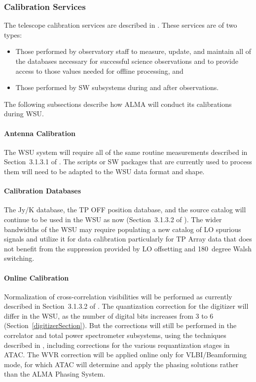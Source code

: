 

\subsubsection{Calibration Services}

The telescope calibration services are described in \cite{acsos}. These services are of two types: 
\begin{itemize}[itemsep=-0.5em]
    \item Those performed by observatory staff to measure, update, and maintain all of the  databases necessary for successful science observations and to provide access to those values needed for offline processing, and
    \item Those performed by SW subsystems during and after
observations. 
\end{itemize}

The following subsections describe how ALMA will conduct its calibrations during WSU. 


\paragraph{Antenna Calibration}  
The WSU system will require all of the same routine measurements
described in Section~3.1.3.1 of \cite{CSA-IA}.  The scripts or
SW packages that are currently used to process them will
need to be adapted to the WSU data format and shape.

\paragraph{Calibration Databases}
The Jy/K database, the TP OFF position database, and
the source catalog will continue to be used in the WSU
as now (Section~3.1.3.2 of \cite{CSA-IA}).
The wider
bandwidths of the WSU may require populating a new catalog of LO spurious signals and
utilize it for data calibration particularly for TP Array data that does not benefit from the
suppression provided by LO offsetting and 180~degree Walsh switching.

\paragraph{Online Calibration}  %
\label{sec:WSUonlineCalibration}
Normalization of cross-correlation visibilities will be performed
as currently described in Section~3.1.3.2 of \cite{CSA-IA}.  The
quantization correction for the digitizer will differ in the WSU, as the number of digital bits increases from 3 to 6 (Section~\ref{digitizerSection}).  But the corrections will still be performed in the correlator and total power spectrometer subsystems, using the techniques described in \cite{QC}, including corrections for the various requantization stages in ATAC.  The WVR correction will be applied online only for VLBI/Beamforming mode, for which ATAC
will determine and apply the phasing solutions
rather than the ALMA Phasing System.

